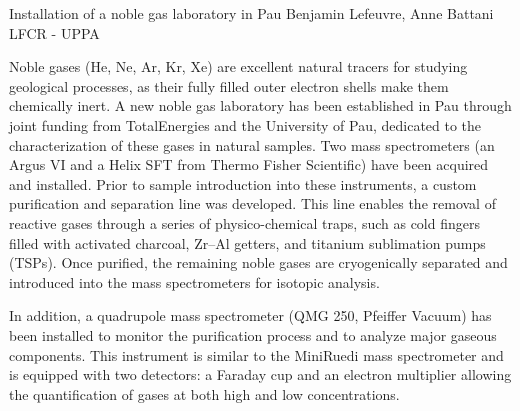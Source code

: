 \begin{conf-abstract}
{Installation of a noble gas laboratory in Pau}
{Benjamin Lefeuvre, Anne Battani}
{LFCR - UPPA}
{Noble gases (He, Ne, Ar, Kr, Xe) are excellent natural tracers for studying geological processes, as their fully filled outer electron shells make them chemically inert. A new noble gas laboratory has been established in Pau through joint funding from TotalEnergies and the University of Pau, dedicated to the characterization of these gases in natural samples. Two mass spectrometers (an Argus VI and a Helix SFT from Thermo Fisher Scientific) have been acquired and installed. Prior to sample introduction into these instruments, a custom purification and separation line was developed. This line enables the removal of reactive gases through a series of physico-chemical traps, such as cold fingers filled with activated charcoal, Zr–Al getters, and titanium sublimation pumps (TSPs). Once purified, the remaining noble gases are cryogenically separated and introduced into the mass spectrometers for isotopic analysis.

In addition, a quadrupole mass spectrometer (QMG 250, Pfeiffer Vacuum) has been installed to monitor the purification process and to analyze major gaseous components. This instrument is similar to the MiniRuedi mass spectrometer and is equipped with two detectors: a Faraday cup and an electron multiplier allowing the quantification of gases at both high and low concentrations.}
\end{conf-abstract}
